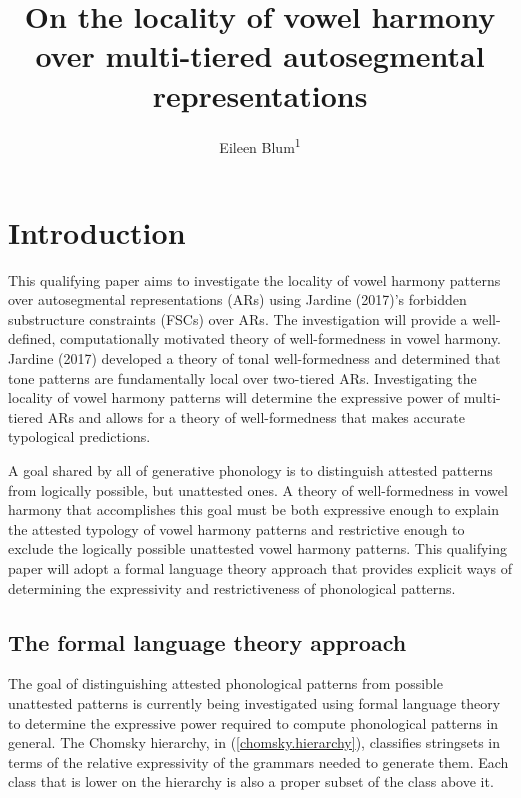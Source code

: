 \documentclass[floatsintext,man]{apa6}
\title{On the locality of vowel harmony over multi-tiered autosegmental
representations}
\author{Eileen Blum\textsuperscript{1}}
\affiliation{
    \vspace{0.5cm}
          \textsuperscript{1} Rutgers University  }
\theoremstyle{definition}
\theoremstyle{definition}
\theoremstyle{definition}
\theoremstyle{remark}
\begin{document}
\maketitle

\setcounter{secnumdepth}{0}



\section{Introduction}\label{introduction}

This qualifying paper aims to investigate the locality of vowel harmony
patterns over autosegmental representations (ARs) using Jardine (2017)'s
forbidden substructure constraints (FSCs) over ARs. The investigation
will provide a well-defined, computationally motivated theory of
well-formedness in vowel harmony. Jardine (2017) developed a theory of
tonal well-formedness and determined that tone patterns are
fundamentally local over two-tiered ARs. Investigating the locality of
vowel harmony patterns will determine the expressive power of
multi-tiered ARs and allows for a theory of well-formedness that makes
accurate typological predictions.

A goal shared by all of generative phonology is to distinguish attested
patterns from logically possible, but unattested ones. A theory of
well-formedness in vowel harmony that accomplishes this goal must be
both expressive enough to explain the attested typology of vowel harmony
patterns and restrictive enough to exclude the logically possible
unattested vowel harmony patterns. This qualifying paper will adopt a
formal language theory approach that provides explicit ways of
determining the expressivity and restrictiveness of phonological
patterns.

\subsection{The formal language theory
approach}\label{the-formal-language-theory-approach}

The goal of distinguishing attested phonological patterns from possible
unattested patterns is currently being investigated using formal
language theory to determine the expressive power required to compute
phonological patterns in general. The Chomsky hierarchy, in
(\ref{chomsky.hierarchy}), classifies stringsets in terms of the
relative expressivity of the grammars needed to generate them. Each
class that is lower on the hierarchy is also a proper subset of the
class above it.
\end{document}

